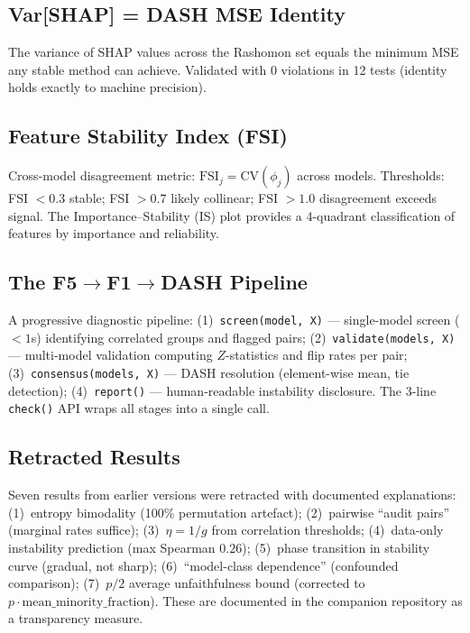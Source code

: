 \documentclass[11pt,a4paper]{article}
\begin{document}
\subsection{Var[SHAP] = DASH MSE Identity}

The variance of SHAP values across the Rashomon set equals the minimum MSE any stable method can achieve.  Validated with 0 violations in 12 tests (identity holds exactly to machine precision).

\subsection{Feature Stability Index (FSI)}

Cross-model disagreement metric: $\mathrm{FSI}_j = \mathrm{CV}(\phi_j)$ across models.  Thresholds: FSI $< 0.3$ stable; FSI $> 0.7$ likely collinear; FSI $> 1.0$ disagreement exceeds signal.  The Importance--Stability (IS) plot provides a 4-quadrant classification of features by importance and reliability.

\subsection{The F5$\to$F1$\to$DASH Pipeline}

A progressive diagnostic pipeline:
(1)~\texttt{screen(model, X)} --- single-model screen ($< 1$s) identifying correlated groups and flagged pairs;
(2)~\texttt{validate(models, X)} --- multi-model validation computing $Z$-statistics and flip rates per pair;
(3)~\texttt{consensus(models, X)} --- DASH resolution (element-wise mean, tie detection);
(4)~\texttt{report()} --- human-readable instability disclosure.
The 3-line \texttt{check()} API wraps all stages into a single call.

\subsection{Retracted Results}

Seven results from earlier versions were retracted with documented explanations:
(1)~entropy bimodality (100\% permutation artefact);
(2)~pairwise ``audit pairs'' (marginal rates suffice);
(3)~$\eta = 1/g$ from correlation thresholds;
(4)~data-only instability prediction (max Spearman $0.26$);
(5)~phase transition in stability curve (gradual, not sharp);
(6)~``model-class dependence'' (confounded comparison);
(7)~$p/2$ average unfaithfulness bound (corrected to $p \cdot \text{mean\_minority\_fraction}$).
These are documented in the companion repository as a transparency measure.
\end{document}

